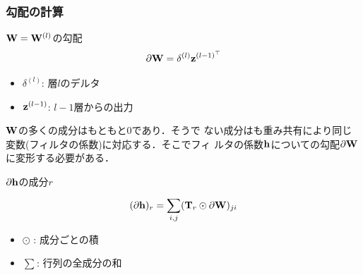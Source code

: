 \documentclass[dvipdfmx,11pt,notheorems]{beamer}
\theoremstyle{definition}
\begin{document}
\begin{frame}[fragile]\frametitle{勾配の計算}

 \begin{block}{${\bf W}={\bf W}^{(l)}$の勾配}
  \begin{equation}
  \partial{\bf W}= {\bf \delta}^{(l)}{\bf z}^{{(l-1)}^\top}
  \end{equation}
 \end{block}

 \begin{itemize}
	\item $\delta^{(l)}$: 層$l$のデルタ
	\item ${\bf z}^{(l-1)}$: $l-1$層からの出力
 \end{itemize}

${\bf W}$の多くの成分はもともと0であり．そうで
ない成分はも重み共有により同じ変数(フィルタの係数)に対応する．そこでフィ
ルタの係数$\bf{h}$についての勾配$\partial{\bf W}$に変形する必要がある．

 \begin{block}{$\partial\bf{h}$の成分$r$}
	\begin{equation}
 (\partial{\bf h})_r =\sum_{i,j}^{}({\bf T}_r\odot\partial{\bf W})_{ji}
	\end{equation}
 \end{block}

\begin{itemize}
 \item $\odot$ : 成分ごとの積
 \item $\sum_{}^{}$: 行列の全成分の和
\end{itemize}

\end{frame}
\end{document}

